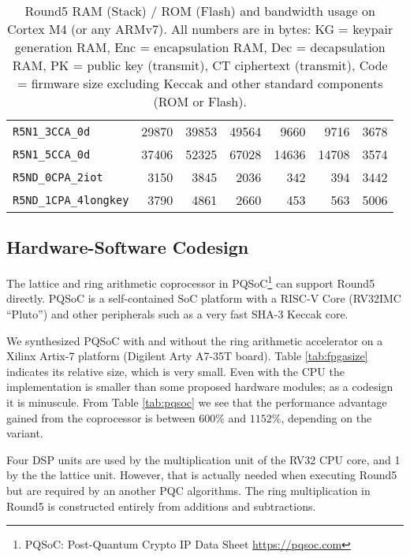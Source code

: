 \documentclass[a4paper]{article}
\begin{document}
\begin{table}
\begin{center}
\begin{tabular}{| l | n{5}{0} n{5}{0} n{5}{0} | n{5}{0} n{5}{0} | n{5}{0} | }
    \verb|R5N1_3CCA_0d| & 29870 & 39853 & 49564 & 9660  & 9716  & 3678  \\
    \verb|R5N1_5CCA_0d| & 37406 & 52325 & 67028 & 14636 & 14708 & 3574  \\
    \verb|R5ND_0CPA_2iot| & 3150  & 3845 & 2036 & 342   & 394   & 3442  \\
    \verb|R5ND_1CPA_4longkey| & 3790 & 4861 & 2660 & 453 & 563  & 5006  \\
    \hline
    \end{tabular}
    \caption{Round5 RAM (Stack) / ROM (Flash) and bandwidth usage on
        Cortex M4 (or any ARMv7). All numbers are in bytes:
        {KG} = keypair generation RAM,  {Enc} = encapsulation RAM,
        {Dec} = decapsulation RAM,      {PK} = public key (transmit),
        {CT} ciphertext (transmit),     {Code} = firmware size excluding
        Keccak and other standard  components (ROM or Flash).}
    \label{tab:m4size}
\end{center}
\end{table}

\subsection{Hardware-Software Codesign}

The lattice and ring arithmetic coprocessor in PQSoC\footnote{PQSoC:
Post-Quantum Crypto IP Data Sheet \url{https://pqsoc.com}} can support
Round5 directly. PQSoC is a self-contained SoC platform with a
RISC-V Core (RV32IMC ``Pluto'') and other peripherals such as a very
fast SHA-3 Keccak core.

We synthesized PQSoC with and without the ring arithmetic accelerator on
a Xilinx Artix-7 platform (Digilent Arty A7-35T board). Table 
\ref{tab:fpgasize} indicates its relative size, which is very small. 
Even with the CPU the implementation is smaller than some proposed
hardware modules; as a codesign it is minuscule.
From Table \ref{tab:pqsoc} we see that the performance advantage 
gained from the coprocessor is between $600\%$ and $1152\%$, depending 
on the variant.

Four DSP units are used by the multiplication unit of the RV32 CPU core,
and 1 by the the lattice unit. However, that is actually needed when
executing Round5 but are required by an another PQC algorithms. The ring
multiplication in Round5 is constructed entirely from additions and
subtractions.
\end{document}
